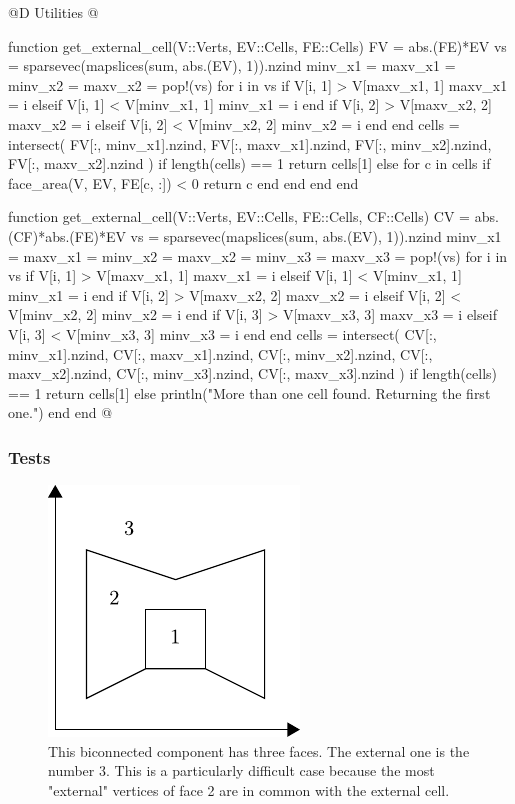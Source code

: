 @D Utilities
@{function get_external_cell(V::Verts, EV::Cells, FE::Cells)
    FV = abs.(FE)*EV
    vs = sparsevec(mapslices(sum, abs.(EV), 1)).nzind
    minv_x1 = maxv_x1 = minv_x2 = maxv_x2 = pop!(vs)
    for i in vs
        if V[i, 1] > V[maxv_x1, 1]
            maxv_x1 = i
        elseif V[i, 1] < V[minv_x1, 1]
            minv_x1 = i
        end
        if V[i, 2] > V[maxv_x2, 2]
            maxv_x2 = i
        elseif V[i, 2] < V[minv_x2, 2]
            minv_x2 = i
        end
    end
    cells = intersect(
        FV[:, minv_x1].nzind, 
        FV[:, maxv_x1].nzind,
        FV[:, minv_x2].nzind,
        FV[:, maxv_x2].nzind
    )
    if length(cells) == 1
        return cells[1]
    else
        for c in cells
            if face_area(V, EV, FE[c, :]) < 0
                return c
            end
        end
    end
end

function get_external_cell(V::Verts, EV::Cells, FE::Cells, CF::Cells)
    CV = abs.(CF)*abs.(FE)*EV
    vs = sparsevec(mapslices(sum, abs.(EV), 1)).nzind
    minv_x1 = maxv_x1 = minv_x2 = maxv_x2 = minv_x3 = maxv_x3 = pop!(vs)
    for i in vs
        if V[i, 1] > V[maxv_x1, 1]
            maxv_x1 = i
        elseif V[i, 1] < V[minv_x1, 1]
            minv_x1 = i
        end
        if V[i, 2] > V[maxv_x2, 2]
            maxv_x2 = i
        elseif V[i, 2] < V[minv_x2, 2]
            minv_x2 = i
        end
        if V[i, 3] > V[maxv_x3, 3]
            maxv_x3 = i
        elseif V[i, 3] < V[minv_x3, 3]
            minv_x3 = i
        end
    end
    cells = intersect(
        CV[:, minv_x1].nzind, 
        CV[:, maxv_x1].nzind,
        CV[:, minv_x2].nzind,
        CV[:, maxv_x2].nzind,
        CV[:, minv_x3].nzind,
        CV[:, maxv_x3].nzind
    )
    if length(cells) == 1
        return cells[1]
    else
        println("More than one cell found. Returning the first one.")
    end
end
@}

\subsubsection{Tests}
\begin{figure}[h]
    \centering
    \includegraphics{./img/ch2-externcell.pdf}
    \caption{This biconnected component has three faces. The external one is the number 3.
    This is a particularly difficult case because the most "external" vertices of face 2
    are in common with the external cell.}
\end{figure}

